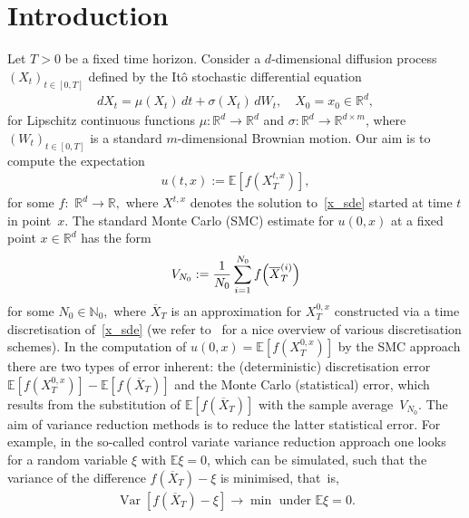 \documentclass[11pt,a4paper]{amsart}
\theoremstyle{plain}
\theoremstyle{definition}
\theoremstyle{remark}
\numberwithin{equation}{section}
\newcommand*{\E}{\mathbb{E}}
\newcommand*{\Var}{\operatorname{Var}}
\newcommand*{\EE}{\mathbb E}
\newcommand*{\bbR}{\mathbb R}
\newcommand*{\cD}{\mathcal D}
\renewcommand*{\doteq}{:=}
\begin{document}
\section*{Introduction}
\label{sec:intro}
Let \(T>0\) be a fixed time horizon.
Consider a $d$-dimensional diffusion process
$(X_t)_{t\in[0,T]}$
defined by the It\^o stochastic differential equation
\begin{align}\label{x_sde}
dX_t
=\mu(X_t)\,dt
+\sigma(X_t)\,dW_{t},
\quad X_{0}=x_0\in\mathbb{R}^d,
\end{align}
for Lipschitz continuous functions
\(\mu\colon\mathbb{R}^d\to\mathbb{R}^d\)
and
\(\sigma\colon\mathbb{R}^d
\to\mathbb{R}^{d\times m}\),
where \((W_t)_{t\in[0,T]}\)
is a standard \(m\)-dimensional Brownian motion.
Our aim is to compute the expectation 
\begin{align}\label{eq:2512a0}
u(t,x)\doteq\E[ f(X_{T}^{t,x})],
\end{align}
for some \(f:\) \(\mathbb{R}^d\to \mathbb{R},\) where $X^{t,x}$ denotes the solution to~\eqref{x_sde} started
at time $t$ in point~$x$. The standard Monte Carlo (SMC)
estimate for \(u(0,x)\) at a fixed point \(x\in \bbR^d\) has the form
\begin{align}\label{eq:2512a1}
V_{N_0}\doteq\frac{1}{N_0}\sum_{i=1}^{N_0} f\Bigl(\overline{X}_T^{(i)}\Bigr)
\end{align} 
for some \(N_0\in \mathbb{N}_0,\) where \(\overline{X}_T\) is an approximation for \(X^{0,x}_T\) constructed via a time discretisation of~\eqref{x_sde} (we refer to~\cite{KP} for a nice overview of various discretisation schemes).
In the computation of $u(0,x)=\EE [f(X^{0,x}_T)]$
by the SMC approach
there are two types of error inherent:
the (deterministic) discretisation error
$\EE [f(X^{0,x}_T)]-\EE [f(\overline X_{T})]$
and the Monte Carlo (statistical) error,
which results from the substitution of
$\EE [f(\overline{X}_{T})]$
with the sample average~$V_{N_0}$.
The aim of variance reduction methods is to reduce the latter statistical error.  For example, in the so-called control variate variance reduction approach
one looks for a random variable
\(\xi\) with \(\EE \xi=0\),
which can be simulated,
such that
the variance of the difference
\(f(\overline{X}_{T})-\xi\) is minimised, that~is,
\begin{align*}
\Var[f(\overline{X}_{T})-\xi]\to\min\text{ under } \EE\xi=0.
\end{align*}
\end{document}
